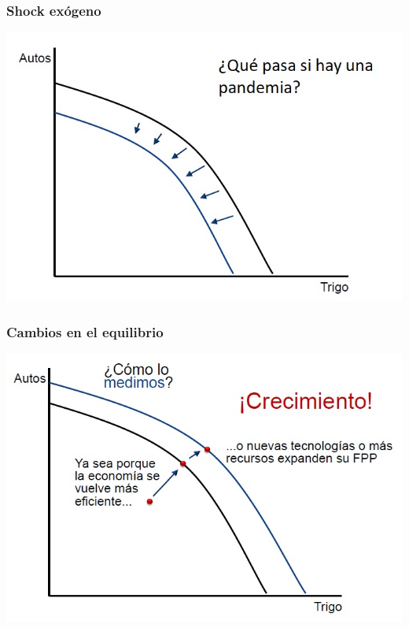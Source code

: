\documentclass{beamer}
\begin{document}
\begin{frame}
\frametitle{Shock exógeno}
\begin{center}
    \includegraphics[scale=0.6]{Slides Principios de Economia/Tema_11.9_pandemia.jpg}
\end{center}
\end{frame}

\begin{frame}
\frametitle{Cambios en el equilibrio}
\begin{center}
    \includegraphics[scale=0.6]{Slides Principios de Economia/Tema_11.10_crecimiento.jpg}
\end{center}
\end{frame}
\end{document}
